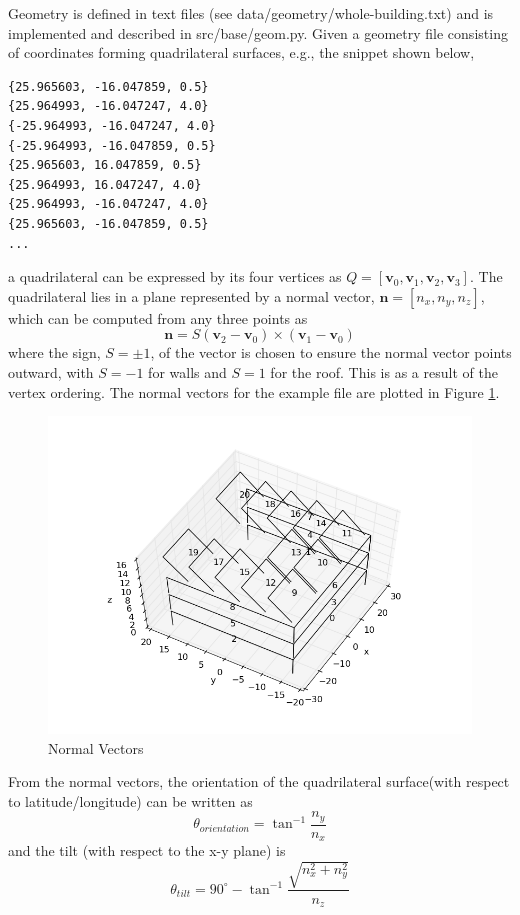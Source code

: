\documentclass[11pt]{article}
\begin{document}
Geometry is defined in text files (see data/geometry/whole-building.txt) and is implemented and described in src/base/geom.py. Given a geometry file consisting of coordinates forming quadrilateral surfaces, e.g., the snippet shown below,
\begin{verbatim}
{25.965603, -16.047859, 0.5}
{25.964993, -16.047247, 4.0}
{-25.964993, -16.047247, 4.0}
{-25.964993, -16.047859, 0.5}
{25.965603, 16.047859, 0.5}
{25.964993, 16.047247, 4.0}
{25.964993, -16.047247, 4.0}
{25.965603, -16.047859, 0.5}
...
\end{verbatim}
a quadrilateral can be expressed by its four vertices as $Q = [\mathbf{v}_0,\mathbf{v}_1,\mathbf{v}_2,\mathbf{v}_3]$. The quadrilateral lies in a plane represented by a normal vector, $\mathbf{n} = [n_x,n_y,n_z]$, which can be computed from any three points as 
\[
\mathbf{n} = S(\mathbf{v}_2-\mathbf{v}_0)\times (\mathbf{v}_1-\mathbf{v}_0)
\]
where the sign, $S = \pm 1$, of the vector is chosen to ensure the normal vector points outward, with $S = -1$ for walls and $S = 1$ for the roof. This is as a result of the vertex ordering. The normal vectors for the example file are plotted in Figure \ref{fig:normals}.
\begin{figure}
\centering
\includegraphics[width=1.0\textwidth]{images/whole-building.png}
\caption{Normal Vectors}
\label{fig:normals}
\end{figure}
From the normal vectors, the orientation of the quadrilateral surface(with respect to latitude/longitude) can be written as
\[
\theta_{orientation} = \tan^{-1}\frac{n_y}{n_x}
\]
and the tilt (with respect to the x-y plane) is
\[
\theta_{tilt} = 90^\circ - \tan^{-1}\frac{\sqrt{n_x^2+n_y^2}}{n_z}
\]
\end{document}

